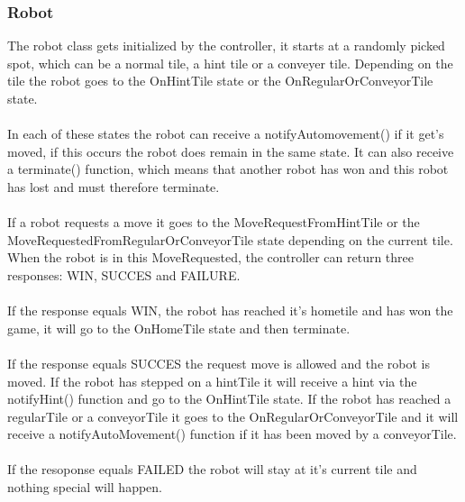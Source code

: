 	\subsubsection{Robot}
	The robot class gets initialized by the controller, it starts at a randomly picked spot, which can be a normal tile, a hint tile or a conveyer tile. Depending on the tile the robot goes to the OnHintTile state or the OnRegularOrConveyorTile state.\\
\\
In each of these states the robot can receive a notifyAutomovement() if it get's moved, if this occurs the robot does remain in the same state. It can also receive a terminate() function, which means that another robot has won and this robot has lost and must therefore terminate.\\
\\
If a robot requests a move it goes to the MoveRequestFromHintTile or the MoveRequestedFromRegularOrConveyorTile state depending on the current tile. When the robot is in this MoveRequested, the controller can return three responses: WIN, SUCCES and FAILURE.\\
\\
If the response equals WIN, the robot has reached it's hometile and has won the game, it will go to the OnHomeTile state and then terminate. \\
\\
If the response equals SUCCES the request move is allowed and the robot is moved. If the robot has stepped on a hintTile it will receive a hint via the notifyHint() function and go to the OnHintTile state. If the robot has reached a regularTile or a conveyorTile it goes to the OnRegularOrConveyorTile and it will receive a notifyAutoMovement() function if it has been moved by a conveyorTile.\\
\\
If the resoponse equals FAILED the robot will stay at it's current tile and nothing special will happen.\\
	
